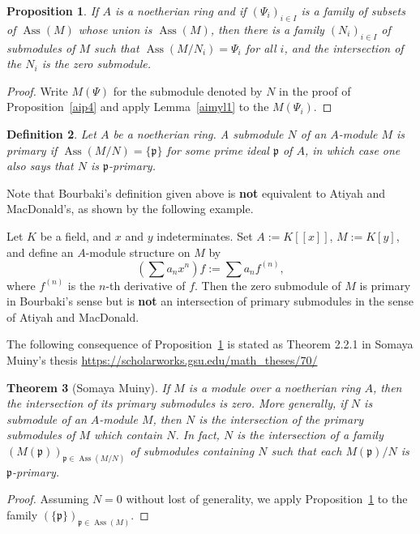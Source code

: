 \documentclass[parskip=half,fontsize=12pt]{scrartcl}%
\newcommand{\oo}{\operatorname}\newcommand{\ooo}{\operatorname*}
\newcommand{\mf}{\mathfrak}
\newcommand{\ppp}{\mf p}
\newcommand{\Ass}{\oo{Ass}}
\newtheorem{thm}{Theorem}%
\newtheorem{df}[thm]{Definition}
\newtheorem{prop}[thm]{Proposition}
\begin{document}
\begin{prop}\label{aimyl2}
If $A$ is a noetherian ring and if $(\Psi_i)_{i\in I}$ is a family of subsets of $\Ass(M)$ whose union is $\Ass(M)$, then there is a family $(N_i)_{i\in I}$ of submodules of $M$ such that $\Ass(M/N_i)=\Psi_i$ for all $i$, and the intersection of the $N_i$ is the zero submodule.
\end{prop}
\begin{proof}
Write $M(\Psi)$ for the submodule denoted by $N$ in the proof of Proposition~\ref{aip4} and apply Lemma~\ref{aimyl1} to the $M(\Psi_i)$.%
\end{proof}

\begin{df}
Let $A$ be a noetherian ring. A submodule $N$ of an $A$-module $M$ is \emph{primary} if $\Ass(M/N)=\{\ppp\}$ for some prime ideal $\ppp$ of $A$, in which case one also says that $N$ is $\ppp$\emph{-primary}. 
\end{df}

Note that Bourbaki's definition given above is \textbf{not} equivalent to Atiyah and MacDonald's, as shown by the following example.

Let $K$ be a field, and $x$ and $y$ indeterminates. Set $A:=K[[x]]$, $M:=K[y]$, and define an $A$-module structure on $M$ by 
$$
\left(\sum a_nx^n\right)f:=\sum a_nf^{(n)},
$$ 
where $f^{(n)}$ is the $n$-th derivative of $f$. Then the zero submodule of $M$ is primary in Bourbaki's sense but is \textbf{not} an intersection of primary submodules in the sense of Atiyah and MacDonald.

The following consequence of Proposition~\ref{aimyl2} is stated as Theorem 2.2.1 in Somaya Muiny's thesis \href{https://scholarworks.gsu.edu/math_theses/70/}{https://scholarworks.gsu.edu/math\_theses/70/}

\begin{thm}[Somaya Muiny]\label{somaya}
If $M$ is a module over a noetherian ring $A$, then the intersection of its primary submodules is zero. More generally, if $N$ is submodule of an $A$-module $M$, then $N$ is the intersection of the primary submodules of $M$ which contain $N$. In fact, $N$ is the intersection of a family $(M(\ppp))_{\ppp\in\Ass(M/N)}$ of submodules containing $N$ such that each $M(\ppp)/N$ is $\ppp$-primary.
\end{thm}
\begin{proof}
Assuming $N=0$ without lost of generality, we apply Proposition~\ref{aimyl2} to the family $(\{\ppp\})_{\ppp\in\Ass(M)}$.
\end{proof}
\end{document}
